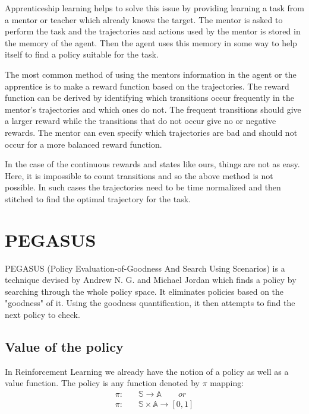 \documentclass[BTech]{iitmdiss}
\begin{document}
Apprenticeship learning \cite{ApprenticeshipLearning} helps to solve this issue by providing  learning a task from a mentor or teacher which already knows the target. The mentor is asked to perform the task and the trajectories and actions used by the mentor is stored in the memory of the agent. Then the agent uses this memory in some way to help itself to find a policy suitable for the task.

The most common method of using the mentors information in the agent or the apprentice is to make a reward function based on the trajectories. The reward function can be derived by identifying which transitions occur frequently in the mentor's trajectories and which ones do not. The frequent transitions should give a larger reward while the transitions that do not occur give no or negative rewards. The mentor can even specify which trajectories are bad and should not occur for a more balanced reward function.

In the case of the continuous rewards and states like ours, things are not as easy. Here, it is impossible to count transitions and so the above method is not possible. In such cases the trajectories need to be time normalized and then stitched to find the optimal trajectory for the task.


\chapter{PEGASUS}

PEGASUS \cite{PEGASUS} (Policy Evaluation-of-Goodness And Search Using Scenarios) is a technique devised by Andrew N. G. and Michael Jordan which finds a policy by searching through the whole policy space. It eliminates policies based on the "goodness" of it. Using the goodness quantification, it then attempts to find the next policy to check.

\section{Value of the policy}

In Reinforcement Learning we already have the notion of a policy as well as a value function. The policy is any function denoted by $\pi$ mapping:
\begin{equation} \begin{split}
  \pi :& \quad \mathbb{S} \rightarrow \mathbb{A} \qquad or \\
  \pi :& \quad \mathbb{S} \times \mathbb{A} \rightarrow [0,1]
\end{split} \end{equation}
\end{document}
